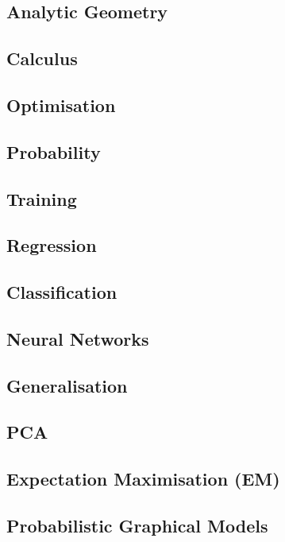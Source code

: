\documentclass[9pt]{extarticle}
\begin{document}
  \begin{multicols}{2}
  \subsection*{Analytic Geometry}
  

  \subsection*{Calculus}
  

  \subsection*{Optimisation}
  

  \subsection*{Probability}
  

  \subsection*{Training}
  

  \subsection*{Regression}
  

  \subsection*{Classification}
  

  \subsection*{Neural Networks}
  

  \subsection{Generalisation}
  

  \subsection{PCA}
  
  \subsection*{Expectation Maximisation (EM)}
  

  \subsection*{Probabilistic Graphical Models}
  

  \end{multicols}
\end{document}
